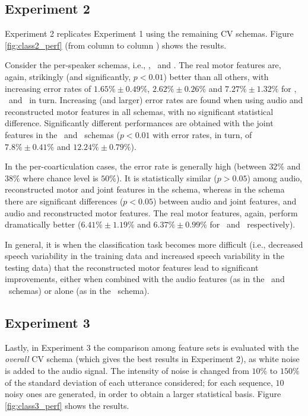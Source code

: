 \subsection{Experiment 2}
\label{subsec:exp2}

Experiment 2 replicates Experiment 1 using the remaining CV schemas.
Figure \ref{fig:class2_perf} (from column \spka to column \cob) shows the results.

Consider the per-speaker schemas, i.e., \spka, \spkb\ and \spkc. The real motor
features are, again, strikingly (and significantly, $p<0.01$) better than all others,
with increasing error rates of
$1.65\% \pm 0.49\%$,
$2.62\% \pm 0.26\%$ and
$7.27\% \pm 1.32\%$ for \spka, \spkb\ and \spkc\ in turn. Increasing (and larger) error
rates are found when using audio and reconstructed motor features in all schemas, with
no significant statistical difference. Significantly different performances are obtained
with the joint features in the \spkb\ and \spkc\ schemas ($p<0.01$ with error rates, in turn,
of $7.8\% \pm 0.41\%$ and $12.24\% \pm 0.79\%$).

In the per-coarticulation cases, the error rate is generally high (between $32\%$ and $38\%$
where chance level is $50\%$). It is statistically similar ($p>0.05$) among audio, reconstructed
motor and joint features in the \coa schema, whereas in the \cob schema there are significant 
differences ($p<0.05$) between audio and joint features, and audio and reconstructed motor features.
The real motor features, again, perform dramatically better
($6.41\% \pm 1.19\%$ and $6.37\% \pm 0.99\%$ for \coa\ and \cob\ respectively).

In general, it is when the classification task becomes more difficult (i.e., decreased speech variability in the 
 training data and increased speech variability in the testing data) that the reconstructed motor features 
lead to significant improvements, either when combined with the audio features (as in the \spkb\ and \spkc\ 
schemas) or alone (as in the \cob\ schema).

\subsection{Experiment 3}
\label{subsec:exp3}

Lastly, in Experiment 3 the comparison among feature sets is evaluated with the
\emph{overall} CV schema (which gives the best results in Experiment 2), as white noise is added
to the audio signal. The intensity of noise is changed from $10\%$ to $150\%$ of
the standard deviation of each utterance considered; for each sequence, $10$ noisy
ones are generated, in order to obtain a larger statistical basis.
Figure \ref{fig:class3_perf} shows the results.

